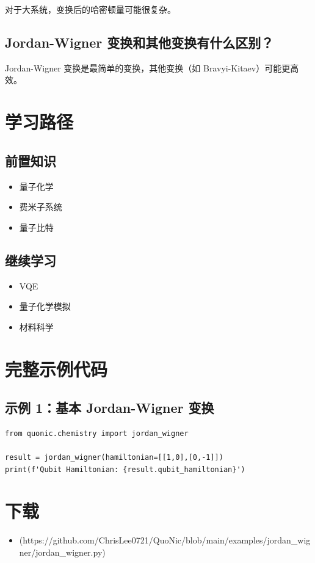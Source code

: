 \documentclass[12pt,a4paper]{article}
\begin{document}
对于大系统，变换后的哈密顿量可能很复杂。

\subsection{Jordan-Wigner 变换和其他变换有什么区别？}

Jordan-Wigner 变换是最简单的变换，其他变换（如 Bravyi-Kitaev）可能更高效。

\section{学习路径}

\subsection{前置知识}
\begin{itemize}
  \item 量子化学
  \item 费米子系统
  \item 量子比特
\end{itemize}

\subsection{继续学习}
\begin{itemize}
  \item VQE
  \item 量子化学模拟
  \item 材料科学
\end{itemize}

\section{完整示例代码}

\subsection{示例 1：基本 Jordan-Wigner 变换}

\begin{verbatim}
from quonic.chemistry import jordan_wigner

result = jordan_wigner(hamiltonian=[[1,0],[0,-1]])
print(f'Qubit Hamiltonian: {result.qubit_hamiltonian}')
\end{verbatim}

\section{下载}

\begin{itemize}
  \item [jordan\_wigner.py](https://github.com/ChrisLee0721/QuoNic/blob/main/examples/jordan_wigner/jordan_wigner.py)
\end{itemize}
\end{document}
